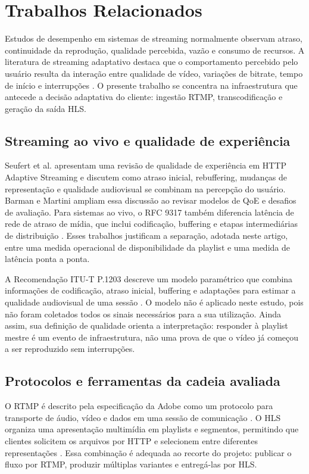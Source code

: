 \section{Trabalhos Relacionados}

Estudos de desempenho em sistemas de streaming normalmente observam atraso, continuidade da reprodução, qualidade percebida, vazão e consumo de recursos. A literatura de streaming adaptativo destaca que o comportamento percebido pelo usuário resulta da interação entre qualidade de vídeo, variações de bitrate, tempo de início e interrupções \citep{seufert,barman}. O presente trabalho se concentra na infraestrutura que antecede a decisão adaptativa do cliente: ingestão RTMP, transcodificação e geração da saída HLS.

\subsection{Streaming ao vivo e qualidade de experiência}

Seufert et al. apresentam uma revisão de qualidade de experiência em HTTP Adaptive Streaming e discutem como atraso inicial, rebuffering, mudanças de representação e qualidade audiovisual se combinam na percepção do usuário. Barman e Martini ampliam essa discussão ao revisar modelos de QoE e desafios de avaliação. Para sistemas ao vivo, o RFC 9317 também diferencia latência de rede de atraso de mídia, que inclui codificação, buffering e etapas intermediárias de distribuição \citep{rfc9317}. Esses trabalhos justificam a separação, adotada neste artigo, entre uma medida operacional de disponibilidade da playlist e uma medida de latência ponta a ponta.

A Recomendação ITU-T P.1203 descreve um modelo paramétrico que combina informações de codificação, atraso inicial, buffering e adaptações para estimar a qualidade audiovisual de uma sessão \citep{itu1203}. O modelo não é aplicado neste estudo, pois não foram coletados todos os sinais necessários para a sua utilização. Ainda assim, sua definição de qualidade orienta a interpretação: responder à playlist mestre é um evento de infraestrutura, não uma prova de que o vídeo já começou a ser reproduzido sem interrupções.

\subsection{Protocolos e ferramentas da cadeia avaliada}

O RTMP é descrito pela especificação da Adobe como um protocolo para transporte de áudio, vídeo e dados em uma sessão de comunicação \citep{rtmp}. O HLS organiza uma apresentação multimídia em playlists e segmentos, permitindo que clientes solicitem os arquivos por HTTP e selecionem entre diferentes representações \citep{hls}. Essa combinação é adequada ao recorte do projeto: publicar o fluxo por RTMP, produzir múltiplas variantes e entregá-las por HLS.

